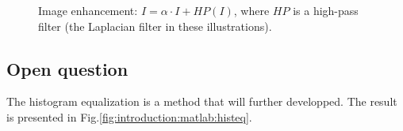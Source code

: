 \begin{figure}[htbp]
 \centering
 
 \hspace{1cm}
 
 \hspace{1cm}

 \caption{Image enhancement: $I=\alpha\cdot I+HP(I)$, where $HP$ is a high-pass filter (the Laplacian filter in these illustrations).}
 \label{fig:introduction:matlab:enhancement}
\end{figure}

\subsection{Open question}
The histogram equalization is a method that will further developped. The result is presented in Fig.\ref{fig:introduction:matlab:histeq}.

